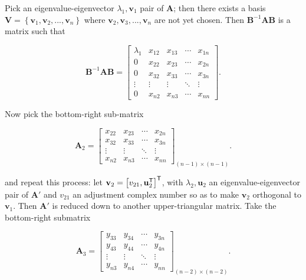 	Pick an eigenvalue-eigenvector $\lambda_1,\mathbf{v}_1$ pair of $\mathbf{A}$; then there exists a basis $\mathbf{V} = \left\{\mathbf{v}_1,\mathbf{v}_2,...,\mathbf{v}_n\right\}$ where $\mathbf{v}_2,\mathbf{v}_3,...,\mathbf{v}_n$ are not yet chosen. Then $\mathbf{B}^{-1}\mathbf{AB}$ is a matrix such that

\begin{equation} \mathbf{B}^{-1}\mathbf{AB} = \left[\begin{array}{ccccc} \lambda_1 & x_{12} & x_{13} & \cdots & x_{1n} \\[3mm] 0 & x_{22} & x_{23} & \cdots & x_{2n} \\[3mm] 0 & x_{32} & x_{33} & \cdots & x_{3n} \\[3mm] \vdots & \vdots & \vdots & \ddots & \vdots \\[3mm] 0 & x_{n2} & x_{n3} & \cdots & x_{nn} \end{array}\right]. \end{equation}

	Now pick the bottom-right sub-matrix

\begin{equation} \mathbf{A}_2 = \left[\begin{array}{cccc} x_{22} & x_{23} & \cdots & x_{2n} \\[3mm] x_{32} & x_{33} & \cdots & x_{3n} \\[3mm] \vdots & \vdots & \ddots & \vdots \\[3mm] x_{n2} & x_{n3} & \cdots & x_{nn} \end{array}\right]_{(n-1)\times (n-1)}. \end{equation}

	\noindent and repeat this process: let $\mathbf{v}_2 = \left[v_{21}, \mathbf{u}_2^{\mathsf{T}}\right]^{\mathsf{T}}$, with $\lambda_2, \mathbf{u}_2$ an eigenvalue-eigenvector pair of $\mathbf{A'}$ and $v_{21}$ an adjustment complex number so as to make $\mathbf{v}_2$ orthogonal to $\mathbf{v}_1$. Then $\mathbf{A}'$ is reduced down to another upper-triangular matrix. Take the bottom-right submatrix

\begin{equation} \mathbf{A}_3 = \left[\begin{array}{cccc} y_{33} & y_{34} & \cdots & y_{3n} \\[3mm] y_{43} & y_{44} & \cdots & y_{4n} \\[3mm] \vdots & \vdots & \ddots & \vdots \\[3mm] y_{n3} & y_{n4} & \cdots & y_{nn} \end{array}\right]_{(n-2)\times (n-2)}. \end{equation}

